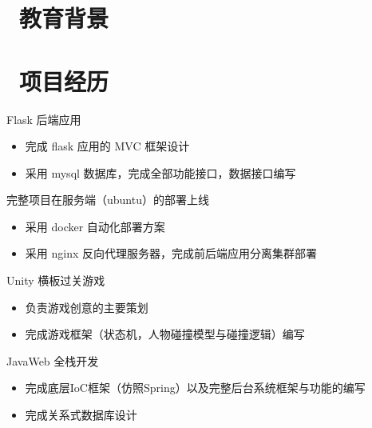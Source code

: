 \documentclass{resume}
\begin{document}


 
\section{\faGraduationCap\  教育背景}

\section{\faUsers\ 项目经历}

\begin{onehalfspacing}
Flask 后端应用
\begin{itemize}
  \item 完成 flask 应用的 MVC 框架设计
  \item 采用 mysql 数据库，完成全部功能接口，数据接口编写
\end{itemize}
完整项目在服务端（ubuntu）的部署上线
\begin{itemize}
  \item 采用 docker 自动化部署方案
  \item 采用 nginx 反向代理服务器，完成前后端应用分离集群部署
\end{itemize}
\end{onehalfspacing}

\begin{onehalfspacing}
Unity 横板过关游戏
\begin{itemize}
  \item 负责游戏创意的主要策划
  \item 完成游戏框架（状态机，人物碰撞模型与碰撞逻辑）编写
\end{itemize}
\end{onehalfspacing}

\begin{onehalfspacing}
JavaWeb 全栈开发
\begin{itemize}
  \item 完成底层IoC框架（仿照Spring）以及完整后台系统框架与功能的编写
  \item 完成关系式数据库设计
\end{itemize}
\end{onehalfspacing}
\end{document}
